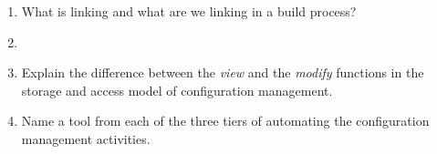 \documentclass[11pt]{article}
\begin{document}
\begin{enumerate}
    \item What is linking and what are we linking in a build process?
    \item[]
    
    \item Explain the difference between the \textit{view} and the \textit{modify} functions in the storage and access model of configuration management.
    
    \item Name a tool from each of the three tiers of automating the configuration management activities.
    
    
    \end{enumerate}
    
    
\end{document}
